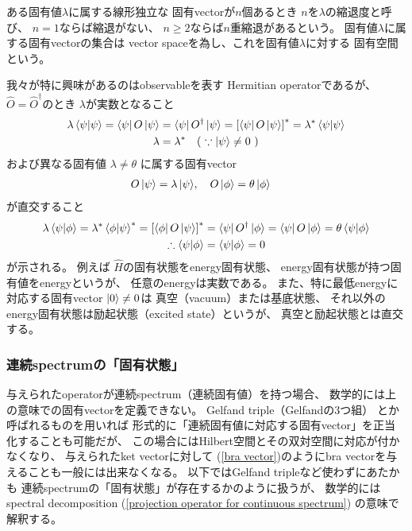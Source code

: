 ある固有値$\lambda$に属する線形独立な
固有vectorが$n$個あるとき
$n$を$\lambda$の縮退度と呼び、
$n = 1$ならば縮退がない、
$n \ge 2$ならば$n$重縮退があるという。
固有値$\lambda$に属する固有vectorの集合は
vector spaceを為し、これを固有値$\lambda$に対する
固有空間という。

我々が特に興味があるのはobservableを表す
Hermitian operatorであるが、
$\hat{O} = \hat{O}^\dagger$のとき
$\lambda$が実数となること
\begin{align}
    \lambda \braket{\psi | \psi}
    =
    \bra{\psi} \hat{O} \ket{\psi}
    &= \bra{\psi} \hat{O}^\dagger \ket{\psi}
    = \left[ \bra{\psi} \hat{O} \ket{\psi}\right]^*
    = \lambda^* \braket{\psi | \psi}
\notag\\
    \lambda &= \lambda^*
    \quad
    (\ 
        \because
        \ket{\psi} \neq 0
    \ 
    )
\end{align}
および異なる固有値
$\lambda \neq \theta$
に属する固有vector
\begin{align}
    O \ket{\psi} = \lambda \ket{\psi}
&,\quad
    O \ket{\phi} = \theta \ket{\phi}
\end{align}
が直交すること
\begin{align}
    \lambda
    \braket{\psi|\phi}
    =
    \lambda^*
    \braket{\phi|\psi}^*
    =
    \left[
        \bra{\phi} O \ket{\psi}
    \right]^*
    &= \bra{\psi} O^\dagger \ket{\phi}
    = \bra{\psi} O \ket{\phi}
    = \theta \braket{\psi|\phi}
\\\therefore
    \braket{\psi|\phi}
    &=\braket{\psi|\phi}
    =0
\label{physically distinct states}
\end{align}
が示される。
例えば
$\hat{H}$の固有状態をenergy固有状態、
energy固有状態が持つ固有値をenergyというが、
任意のenergyは実数である。
また、特に最低energyに対応する固有vector
$\ket{0} \neq 0$は
真空（vacuum）または基底状態、
それ以外のenergy固有状態は励起状態（excited state）というが、
真空と励起状態とは直交する。

\subsubsection{連続spectrumの「固有状態」}

与えられたoperatorが連続spectrum（連続固有値）を持つ場合、
数学的には上の意味での固有vectorを定義できない。
Gelfand triple（Gelfandの$3$つ組）
とか呼ばれるものを用いれば
形式的に「連続固有値に対応する固有vector」を正当化することも可能だが、
この場合にはHilbert空間とその双対空間に対応が付かなくなり、
与えられたket vectorに対して
(\ref{bra vector})のようにbra vectorを与えることも一般には出来なくなる。
以下ではGelfand tripleなど使わずにあたかも
連続spectrumの「固有状態」が存在するかのように扱うが、
数学的にはspectral decomposition
(\ref{projection operator for continuous spectrum})
の意味で解釈する。

